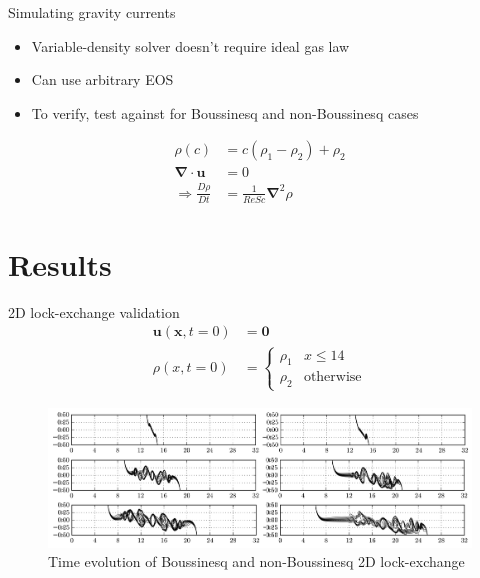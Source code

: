\documentclass[presentation]{beamer}
\begin{document}
\begin{frame}[label={sec:orgb3c64f4}]{Simulating gravity currents}
\begin{itemize}
\item Variable-density solver doesn't require ideal gas law
\item Can use arbitrary EOS
\item To verify, test against \cite{Birman2005} for Boussinesq and non-Boussinesq cases
\end{itemize}
\begin{align*}
  \rho \left( c \right) &= c \left( \rho_1 - \rho_2 \right) + \rho_2 \\
  \boldsymbol{\nabla}\cdot\boldsymbol{u} &= 0 \\
  \Rightarrow \frac{D\rho}{Dt} &= \frac{1}{ReSc} {\boldsymbol{\nabla}}^2 \rho
\end{align*}
\end{frame}
\section{Results}
\label{sec:org6bf3b24}

\begin{frame}[label={sec:org9cb657e}]{2D lock-exchange validation}
\begin{equation*}
  \begin{split}
    \boldsymbol{u} \left( \boldsymbol{x}, t=0 \right) &= \boldsymbol{0}\\
    \rho \left( x, t=0 \right) &=
    \begin{cases}
      \rho_1 & x \leq 14 \\
      \rho_2 & \mbox{otherwise}
    \end{cases}
  \end{split}
\end{equation*}

\begin{figure}[htbp]
\centering
\includegraphics[width=.9\linewidth]{./figures/2d-lockexch.png}
\caption{Time evolution of Boussinesq and non-Boussinesq 2D lock-exchange}
\end{figure}
\end{frame}
\end{document}
